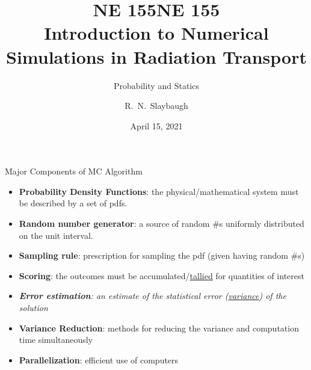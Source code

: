 \documentclass[xcolor=x11names,compress]{beamer}
\title{NE 155}
\author{R.\ N.\ Slaybaugh}
\date{April 15, 2021}
\renewcommand{\(}{\begin{columns}}
\renewcommand{\)}{\end{columns}}
\newcommand{\<}[1]{\begin{column}{#1}}
\renewcommand{\>}{\end{column}}
\begin{document}
\begin{frame}
\title{NE 155\\Introduction to Numerical Simulations in Radiation Transport}
\subtitle{Probability and Statics}
\titlepage
\end{frame}

\begin{frame}{Major Components of MC Algorithm}

\begin{itemize}
  \item \textbf{Probability Density Functions}: the physical/mathematical system must be described by a set of pdfs.
  \pause
  \item \textbf{Random number generator}: a source of random \#s uniformly distributed on the unit interval.
  \pause
  \item \textbf{Sampling rule}: prescription for sampling the pdf (given having random \#s)
  \pause
  \item \textbf{Scoring}: the outcomes must be accumulated/\underline{tallied} for quantities of interest
  \pause
  \item \textit{\textbf{Error estimation}: an estimate of the statistical error (\underline{variance}) of the solution}
    \pause
  \item \textbf{Variance Reduction}: methods for reducing the variance and computation time simultaneously
    \pause
  \item \textbf{Parallelization}: efficient use of computers
\end{itemize}
\end{frame}
\end{document}
